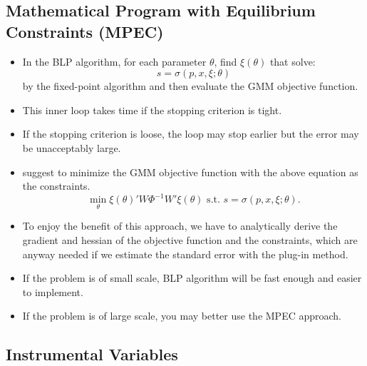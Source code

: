 \documentclass[
]{book}
\providecommand{\tightlist}{%
  \setlength{\itemsep}{0pt}\setlength{\parskip}{0pt}}
\begin{document}
\hypertarget{mathematical-program-with-equilibrium-constraints-mpec}{%
\subsection{Mathematical Program with Equilibrium Constraints (MPEC)}\label{mathematical-program-with-equilibrium-constraints-mpec}}

\begin{itemize}
\tightlist
\item
  In the BLP algorithm, for each parameter \(\theta\), find \(\xi(\theta)\) that solve:
  \begin{equation}
  s = \sigma(p, x, \xi; \theta)
  \end{equation}
  by the fixed-point algorithm and then evaluate the GMM objective function.
\item
  This inner loop takes time if the stopping criterion is tight.
\item
  If the stopping criterion is loose, the loop may stop earlier but the error may be unacceptably large.
\item
  \citet{Dube2012} suggest to minimize the GMM objective function with the above equation as the constraints.
  \begin{equation}
  \min_{\theta} \xi(\theta)' W \Phi^{-1} W' \xi(\theta) \text{   s.t.   } s = \sigma(p, x, \xi; \theta).
  \end{equation}
\item
  To enjoy the benefit of this approach, we have to analytically derive the gradient and hessian of the objective function and the constraints, which are anyway needed if we estimate the standard error with the plug-in method.
\item
  If the problem is of small scale, BLP algorithm will be fast enough and easier to implement.
\item
  If the problem is of large scale, you may better use the MPEC approach.
\end{itemize}

\hypertarget{instrumental-variables}{%
\subsection{Instrumental Variables}\label{instrumental-variables}}
\end{document}
